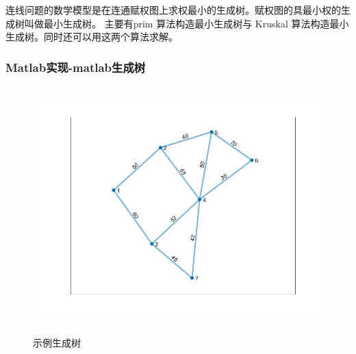 \documentclass[a4paper,20pt]{article}
\begin{document}
\par \noindent 连线问题的数学模型是在连通赋权图上求权最小的生成树。赋权图的具最小权的生
成树叫做最小生成树。
主要有prim 算法构造最小生成树与 Kruskal 算法构造最小生成树。同时还可以用这两个算法求解。
\subsubsection{Matlab实现-matlab生成树}
\begin{figure}[h]
    \centering
    \includegraphics[width=340pt,height=270pt]{figure2.jpg}
    \caption{示例生成树}
\end{figure}
\end{document}
